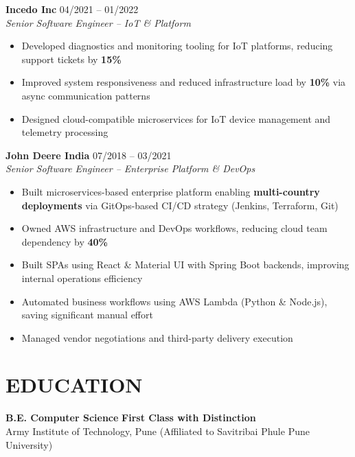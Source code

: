 \documentclass[a4paper,11pt]{article}
\begin{document}
\vspace{10pt}

\noindent
\textbf{Incedo Inc} \hfill 04/2021 -- 01/2022 \\
\textit{Senior Software Engineer -- IoT \& Platform}

\begin{itemize}
\item Developed diagnostics and monitoring tooling for IoT platforms, reducing support tickets by \textbf{15\%}
\item Improved system responsiveness and reduced infrastructure load by \textbf{10\%} via async communication patterns
\item Designed cloud-compatible microservices for IoT device management and telemetry processing
\end{itemize}

\vspace{10pt}

\noindent
\textbf{John Deere India} \hfill 07/2018 -- 03/2021 \\
\textit{Senior Software Engineer -- Enterprise Platform \& DevOps}

\begin{itemize}
\item Built microservices-based enterprise platform enabling \textbf{multi-country deployments} via GitOps-based CI/CD strategy (Jenkins, Terraform, Git)
\item Owned AWS infrastructure and DevOps workflows, reducing cloud team dependency by \textbf{40\%}
\item Built SPAs using React \& Material UI with Spring Boot backends, improving internal operations efficiency
\item Automated business workflows using AWS Lambda (Python \& Node.js), saving significant manual effort
\item Managed vendor negotiations and third-party delivery execution
\end{itemize}

\vspace{6pt}

\section*{EDUCATION}
\noindent
\textbf{B.E. Computer Science} \hfill \textbf{First Class with Distinction} \\
Army Institute of Technology, Pune (Affiliated to Savitribai Phule Pune University)
\end{document}
